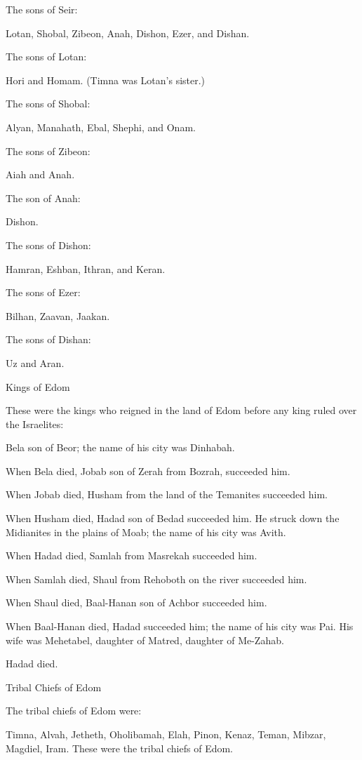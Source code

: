 {\par }{\PP {}The sons
of Seir:
\par }{\PP Lotan,
Shobal,
Zibeon,
Anah,
Dishon,
Ezer,
and Dishan.
\par }{\PP {}The sons
of Lotan:
\par }{\PP Hori
and Homam.
(Timna
was Lotan’s
sister.)
\par }{\PP {}The sons
of Shobal:
\par }{\PP Alyan,
Manahath,
Ebal,
Shephi,
and Onam.
\par }{\PP The sons
of Zibeon:
\par }{\PP Aiah
and Anah.
\par }{\PP {}The son
of Anah:
\par }{\PP Dishon.
\par }{\PP The sons
of Dishon:
\par }{\PP Hamran,
Eshban,
Ithran,
and Keran.
\par }{\PP {}The sons
of Ezer:
\par }{\PP Bilhan,
Zaavan,
Jaakan.
\par }{\PP The sons of
Dishan:
\par }{\PP Uz
and Aran.
\par }{\SH Kings of Edom
\par }{\PP {}These
were the kings
who
reigned
in the land
of Edom
before
any king
ruled
over the Israelites:
\par }{\PP Bela
son
of Beor;
the name
of his city
was Dinhabah.
\par }{\PP {}When Bela
died,
Jobab
son
of Zerah
from Bozrah,
succeeded him.
\par }{\PP {}When Jobab
died,
Husham
from the land
of the Temanites
succeeded him.
\par }{\PP {}When Husham
died,
Hadad
son
of Bedad
succeeded him. He struck
down the Midianites
in the plains
of Moab;
the name
of his city
was Avith.
\par }{\PP {}When Hadad
died,
Samlah
from Masrekah
succeeded him.
\par }{\PP {}When Samlah
died,
Shaul
from Rehoboth
on the river
succeeded him.
\par }{\PP {}When Shaul
died,
Baal-Hanan
son
of Achbor
succeeded him.
\par }{\PP {}When Baal-Hanan
died,
Hadad
succeeded
him; the name
of his city
was Pai.
His wife
was Mehetabel,
daughter
of Matred,
daughter
of Me-Zahab.
\par }{\PP {}Hadad
died.
\par }{\SH Tribal Chiefs of Edom
\par }{\PP The tribal chiefs
of Edom
were:
\par }{\PP Timna,
Alvah,
Jetheth,
Oholibamah,
Elah,
Pinon,
Kenaz,
Teman,
Mibzar,
Magdiel,
Iram.
These
were the tribal chiefs
of Edom.

}
